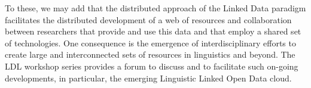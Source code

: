 \smallskip

To these, we may add that the distributed approach of the Linked Data paradigm facilitates the distributed de\-ve\-lop\-ment of a web of resources and collaboration between researchers that provide and use this data and that employ a shared set of technologies. One consequence is the emergence of interdisciplinary efforts to create large and interconnected sets of resources in linguistics and beyond. The LDL workshop series provides a forum to discuss and to facilitate such on-going developments, in particular, the emerging Linguistic Linked Open Data cloud.